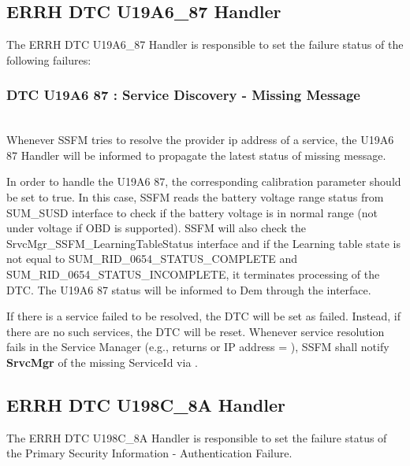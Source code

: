 \subsection{ERRH DTC U19A6_87 Handler}
\label{subsection:ERRHDTCU19A687Handler}
The ERRH DTC U19A6_87 Handler is responsible to set the failure status of the following failures:

\subsubsection{DTC U19A6 87 : Service Discovery - Missing Message}
\\
Whenever SSFM tries to resolve the provider ip address of a service, the U19A6 87 Handler will be informed to propagate the latest status of missing message.

In order to handle the U19A6 87, the corresponding calibration parameter  should be set to true.
In this case, SSFM reads the battery voltage range status from SUM_SUSD  interface to check if the battery voltage is in normal range (not under voltage if OBD is supported).
SSFM will also check the SrvcMgr_SSFM_LearningTableStatus interface and if the Learning table state is not equal to SUM_RID_0654_STATUS_COMPLETE and SUM_RID_0654_STATUS_INCOMPLETE, it terminates processing of the DTC.
The U19A6 87 status will be informed to Dem through the  interface.

If there is a service failed to be resolved, the DTC will be set as failed. Instead, if there are no such services, the DTC will be reset.
Whenever service resolution fails in the Service Manager (e.g.,  returns  or IP address = ), SSFM shall notify \textbf{SrvcMgr} of the missing ServiceId via .

{  }

\subsection{ERRH DTC U198C_8A Handler}
The ERRH DTC U198C_8A Handler is responsible to set the failure status of the Primary Security Information - Authentication Failure.

